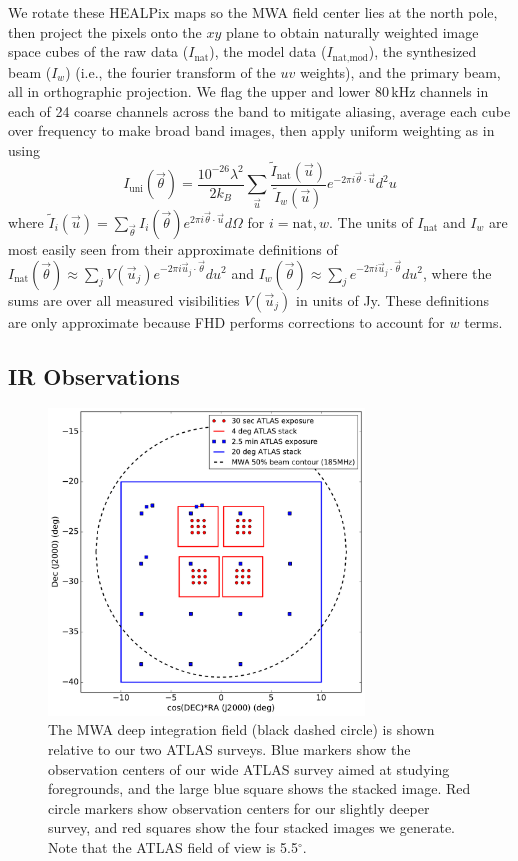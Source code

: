 \documentclass{emulateapj}
\begin{document}
We rotate these HEALPix maps so the MWA field center lies at the north pole, then project the pixels onto the $xy$ plane to obtain naturally weighted image space cubes of the raw data ($I_\text{nat}$), the model data ($I_\text{nat,mod}$), the synthesized beam ($I_w$) (i.e., the fourier transform of the $uv$ weights), and the primary beam, all in orthographic projection. We flag the upper and lower 80\,kHz channels in each of 24 coarse channels across the band to mitigate aliasing, average each cube over frequency to make broad band images, then apply uniform weighting as in \citet{dillonneben} using
\begin{equation}
\label{eqn:uniformweighting}
I_\text{uni}(\vec{\theta}) = \frac{10^{-26}\lambda^2}{2k_B } \sum_{\vec{u}} \frac{\tilde{I}_\text{nat}(\vec{u})}{\tilde{I}_w(\vec{u})} e^{-2\pi i \vec{\theta}\cdot\vec{u}}d^2u
\end{equation}
where $\tilde{I}_i(\vec{u}) = \sum_{\vec{\theta}} I_i(\vec{\theta}) e^{2\pi i\vec{\theta}\cdot\vec{u}} d\Omega$ for $i=\text{nat},w$. The units of $I_\text{nat}$ and $I_w$ are most easily seen from their approximate definitions of $I_\text{nat}(\vec{\theta})\approx\sum_j V(\vec{u}_j)e^{-2\pi i\vec{u}_j\cdot\vec{\theta}}du^2$ and $I_w(\vec{\theta})\approx\sum_j e^{-2\pi i\vec{u}_j\cdot\vec{\theta}}du^2$, where the sums are over all measured visibilities $V(\vec{u}_j)$ in units of Jy. These definitions are only approximate because FHD performs corrections to account for $w$ terms.

\subsection{IR Observations}

\begin{figure}[h]
\centering
\includegraphics[width=3.3in]{images/survey_overview.pdf}
\caption{The MWA deep integration field (black dashed circle) is shown relative to our two ATLAS surveys. Blue markers show the observation centers of our wide ATLAS survey aimed at studying foregrounds, and the large blue square shows the stacked image. Red circle markers show observation centers for our slightly deeper survey, and red squares show the four stacked images we generate. Note that the ATLAS field of view is 5.5$^\circ$.}
\label{fig:surveyoverview}
\end{figure}
\end{document}
